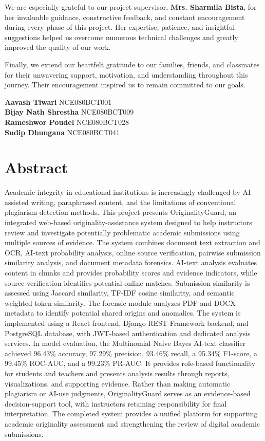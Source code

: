 \documentclass[12pt, a4paper]{report}
\numberwithin{equation}{chapter}
\begin{document}
We are especially grateful to our project supervisor, \textbf{Mrs. Sharmila Bista}, for her invaluable guidance, constructive feedback, and constant encouragement during every phase of this project. Her expertise, patience, and insightful suggestions helped us overcome numerous technical challenges and greatly improved the quality of our work.

Finally, we extend our heartfelt gratitude to our families, friends, and classmates for their unwavering support, motivation, and understanding throughout this journey. Their encouragement inspired us to remain committed to our goals.

\vspace{2cm}
\noindent
\textbf{Aavash Tiwari}  \hfill NCE080BCT001 \\
\textbf{Bijay Nath Shrestha} \hfill NCE080BCT009 \\
\textbf{Rameshwor Poudel} \hfill NCE080BCT028 \\
\textbf{Sudip Dhungana} \hfill NCE080BCT041

\newpage

\chapter*{Abstract}
Academic integrity in educational institutions is increasingly challenged by AI-assisted writing, paraphrased content, and the limitations of conventional plagiarism detection methods. This project presents OriginalityGuard, an integrated web-based originality-assistance system designed to help instructors review and investigate potentially problematic academic submissions using multiple sources of evidence. The system combines document text extraction and OCR, AI-text probability analysis, online source verification, pairwise submission similarity analysis, and document metadata forensics. AI-text analysis evaluates content in chunks and provides probability scores and evidence indicators, while source verification identifies potential online matches. Submission similarity is assessed using Jaccard similarity, TF-IDF cosine similarity, and semantic weighted token similarity. The forensic module analyzes PDF and DOCX metadata to identify potential shared origins and anomalies. The system is implemented using a React frontend, Django REST Framework backend, and PostgreSQL database, with JWT-based authentication and dedicated analysis services. In model evaluation, the Multinomial Naive Bayes AI-text classifier achieved 96.43\% accuracy, 97.29\% precision, 93.46\% recall, a 95.34\% F1-score, a 99.45\% ROC-AUC, and a 99.23\% PR-AUC. It provides role-based functionality for students and teachers and presents analysis results through reports, visualizations, and supporting evidence. Rather than making automatic plagiarism or AI-use judgments, OriginalityGuard serves as an evidence-based decision-support tool, with instructors retaining responsibility for final interpretation. The completed system provides a unified platform for supporting academic originality assessment and strengthening the review of digital academic submissions.
\end{document}
